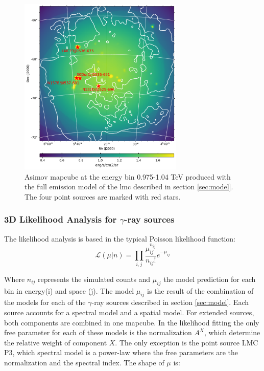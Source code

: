 \documentclass[main.tex]{subfiles}
\begin{document}
\begin{figure}
  \centering
  \includegraphics[width=0.7\textwidth]{Pictures/Asimov_0-975_1-04TeVmap.pdf}
  \caption{\label{fig:asimov} Asimov mapcube at the energy bin 0.975-1.04 TeV produced with the full emission model of the \gls{lmc} described in section \ref{sec:model}. The four point sources are marked with red stars.  }
\end{figure}

\subsubsection{3D Likelihood Analysis for $\gamma$-ray sources}

The likelihood analysis is based in the typical Poisson likelihood function:
\begin{equation}
  \mathcal{L}(\mu | n) = \prod_{i,j}\frac{\mu_{ij}^{n_{ij}}}{n_{ij}!}e^{-\mu_{ij}}
  \label{eq:likelihood}
\end{equation}

Where $n_{ij}$ represents the simulated counts and $\mu_{ij}$ the model prediction for each bin in energy(i) and space (j). The model $\mu_{ij}$ is the result of the combination of the models for each of the $\gamma$-ray sources described in section \ref{sec:model}. Each source accounts for a spectral model and a spatial model. For extended sources, both components are combined in one mapcube. In the likelihood fitting the only free parameter for each of these models is the normalization $A^{X}$, which determine the relative weight of component $X$. The only exception is the point source LMC P3, which spectral model is a power-law where the free parameters are the normalization and the spectral index. The shape of $\mu$ is:
\end{document}
